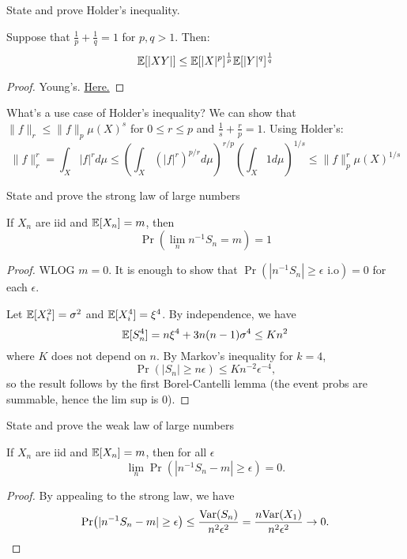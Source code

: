 \documentclass[avery5388,grid,frame]{flashcards}
\begin{document}
\begin{flashcard}
    {State and prove Holder's inequality.}
    \begin{theorem}
        Suppose that $\frac 1 p + \frac 1 q = 1$ for $p,q>1$. Then:
        $$\mathbb{E}[|XY|] \leq \mathbb{E}[|X|^p]^{\frac 1 p} \mathbb{E}[|Y|^q]^{\frac 1 q}$$
    \end{theorem}

    \begin{proof}
        Young's. \href{https://en.wikipedia.org/wiki/H%C3%B6lder%27s_inequality#Proof_of_H%C3%B6lder's_inequality}{Here.}
    \end{proof}
\end{flashcard}


\begin{flashcard}
    {What's a use case of Holder's inequality?}
    We can show that $\| f \|_r \leq \| f \|_p \mu(X)^s$ for $0 \leq r \leq p$ and $\frac 1 s + \frac r p = 1$. Using Holder's:
    $$\| f \|_r^r = \int_X |f|^r d\mu \leq \left( \int_X (|f|^r)^{p/r} d\mu \right )^{r/p} \left ( \int_X 1 d\mu \right )^{1/s} \leq \| f \|_p^r \mu(X)^{1/s}$$
\end{flashcard}


\begin{flashcard}
    {State and prove the strong law of large numbers}
    \begin{theorem}
        If $X_n$ are iid and $\mathbb{E}[X_n] = m$, then
        $$\Pr(\lim_n n^{-1} S_n = m) = 1$$
    \end{theorem}

    \begin{proof}
        WLOG $m=0$. It is enough to show that $\Pr(|n^{-1} S_n| \geq \epsilon \text{ i.o}) = 0$ for each $\epsilon$.

        Let $\mathbb{E}[X_i^2] = \sigma^2$ and $\mathbb{E}[X_i^4] = \xi^4$. By independence, we have
        $$\mathbb{E}[S_n^4] = n \xi^4 + 3n(n-1) \sigma^4 \leq K n^2$$
        where $K$ does not depend on $n$. By Markov's inequality for $k=4$,
        $$\Pr(|S_n| \geq n \epsilon) \leq K n^{-2} \epsilon^{-4},$$
        so the result follows by the first Borel-Cantelli lemma (the event probs are summable, hence the lim sup is $0$).
    \end{proof}
\end{flashcard}


\begin{flashcard}
    {State and prove the weak law of large numbers}
    \begin{theorem}
        If $X_n$ are iid and $\mathbb{E}[X_n] = m$, then for all $\epsilon$
        $$\lim_n \Pr(| n^{-1} S_n - m| \geq \epsilon) = 0.$$
    \end{theorem}

    \begin{proof}
        By appealing to the strong law, we have
        $$\Pr(| n^{-1} S_n - m| \geq \epsilon) \leq \frac{\text{Var}(S_n)}{n^2 \epsilon^2} = \frac{n \text{Var}(X_1)}{n^2 \epsilon^2} \rightarrow 0.$$
    \end{proof}
\end{flashcard}
\end{document}
